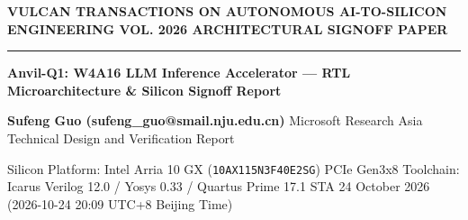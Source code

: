 \documentclass[11pt,a4paper]{article}
\begin{document}
{\scriptsize\sffamily\textcolor{vulcan}{\textbf{VULCAN TRANSACTIONS ON AUTONOMOUS AI-TO-SILICON ENGINEERING \hfill VOL. 2026 \textperiodcentered{} ARCHITECTURAL SIGNOFF PAPER}}\par}

\vspace{1pt}\textcolor{vulcan}{\rule{\textwidth}{1.2pt}}\vspace{4pt}

\begin{center}

{\sffamily\LARGE\bfseries Anvil-Q1: W4A16 LLM Inference Accelerator — RTL Microarchitecture \& Silicon Signoff Report\par}\vspace{3pt}

{\small\sffamily\textbf{Sufeng Guo (\allowbreak{}sufeng\_\allowbreak{}guo@smail.nju.edu.cn)\allowbreak{}} \textperiodcentered{} Microsoft Research Asia \textperiodcentered{} Technical Design and Verification Report\par}\vspace{1pt}

{\scriptsize\sffamily\textcolor{black!75}{Silicon Platform: Intel Arria 10 GX (\texttt{10AX115N3F40E2SG}) PCIe Gen3x8 \textperiodcentered{} Toolchain: Icarus Verilog 12.0 / Yosys 0.33 / Quartus Prime 17.1 STA \textperiodcentered{} 24 October 2026 (\allowbreak{}2026-10-24 20:09 UTC+\allowbreak{}8 Beijing Time)\allowbreak{}}\par}

\end{center}\vspace{2pt}
\end{document}
